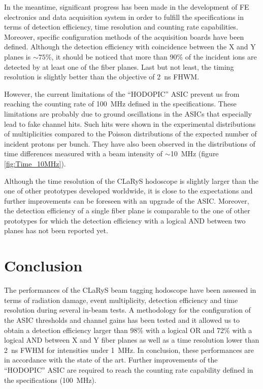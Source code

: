 \documentclass[a4paper,11pt]{article}
\begin{document}
In the meantime, significant progress has been made in the development of FE electronics and data acquisition system in order to fulfill the specifications in terms of detection efficiency, time resolution and counting rate capabilities. Moreover, specific configuration methods of the acquisition boards have been defined. Although the detection efficiency with coincidence between the X and Y planes is $\sim75$\%, it should be noticed that more than 90\% of the incident ions are detected by at least one of the fiber planes. Last but not least, the timing resolution is slightly better than the objective of 2~ns FHWM. 

However, the current limitations of the \enquote{HODOPIC} ASIC prevent us from reaching the counting rate of 100~MHz defined in the specifications. These limitations are probably due to ground oscillations in the ASICs that especially lead to fake channel hits. Such hits were shown in the experimental distributions of multiplicities compared to the Poisson distributions of the expected number of incident protons per bunch. They have also been observed in the distributions of time differences measured with a beam intensity of $\sim$10~MHz (figure \ref{fig:Time_10MHz}).


Although the time resolution of the CLaRyS hodoscope is slightly larger than the one of other prototypes developed worldwide, it is close to the expectations and further improvements can be foreseen with an upgrade of the ASIC. Moreover, the detection efficiency of a single fiber plane is comparable to the one of other prototypes for which the detection efficiency with a logical AND between two planes has not been reported yet. 


\section{Conclusion}

The performances of the CLaRyS beam tagging hodoscope have been assessed in terms of radiation damage, event multiplicity, detection efficiency and time resolution during several in-beam tests. A methodology for the configuration of the ASIC thresholds and channel gains has been tested and it allowed us to obtain a detection efficiency larger than 98\% with a logical OR and 72\% with a logical AND between X and Y fiber planes as well as a time resolution lower than 2~ns FWHM for intensities under 1~MHz. In conclusion, these performances are in accordance with the state of the art. Further improvements of the \enquote{HODOPIC} ASIC are required to reach the counting rate capability defined in the specifications (100~MHz).
\end{document}
